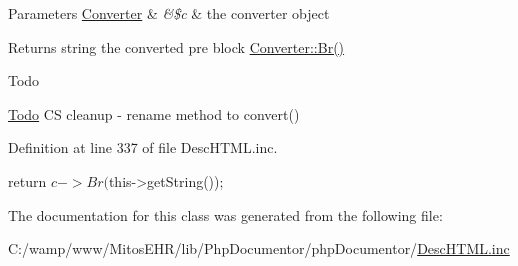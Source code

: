 \begin{DoxyParams}[1]{\-Parameters}
\hyperlink{class_converter}{\-Converter} & {\em \&\$c} & the converter object\\
\hline
\end{DoxyParams}
\begin{DoxyReturn}{\-Returns}
string the converted pre block  \hyperlink{class_converter_a18b91c5b86ba04bf5a54fbd2d49e0b35}{\-Converter\-::\-Br()} 
\end{DoxyReturn}
\begin{DoxyRefDesc}{\-Todo}
\item[\hyperlink{todo__todo000039}{\-Todo}]\-C\-S cleanup -\/ rename method to convert() \end{DoxyRefDesc}


\-Definition at line 337 of file \-Desc\-H\-T\-M\-L.\-inc.


\begin{DoxyCode}
    {
        return $c->Br($this->getString());
    }
\end{DoxyCode}


\-The documentation for this class was generated from the following file\-:\begin{DoxyCompactItemize}
\item 
\-C\-:/wamp/www/\-Mitos\-E\-H\-R/lib/\-Php\-Documentor/php\-Documentor/\hyperlink{_desc_h_t_m_l_8inc}{\-Desc\-H\-T\-M\-L.\-inc}\end{DoxyCompactItemize}
